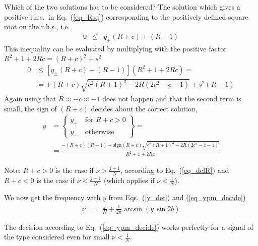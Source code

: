 \documentclass[english, parskip=full]{scrartcl}
\newcommand{\tecxt}{}
\begin{document}
Which of the two solutions has to be considered?
The solution which gives a positive l.h.s.\ in
Eq.~(\ref{eq_Rsq}) corresponding to the positively defined square root on the r.h.s., i.e.
\begin{eqnarray}
  \label{y_plus_minus}
  0 &\leq& y_\pm (R+c) + (R-1)
\end{eqnarray}
This inequality can be evaluated by multiplying with the positive factor
$R^2 + 1 + 2Rc = (R+c)^2 + s^2$
\begin{align}
  0 &\leq [y_\pm (R+c) + (R-1)] (R^2 + 1 + 2Rc)
  =\\
  &= \pm (R+c) \sqrt{c^2(R+1)^2 - 2R(2c^2-c-1)} + s^2(R-1)
\end{align}
Again using that $R \approx -c \approx -1$ does not happen and that the second term is small,
the sign of $(R+c)$ decides about the correct solution,
\begin{align}
  y &= \left\{
          \begin{array}{l}
             y_+ \quad \text{for } R+c > 0
             \\
             y_- \quad \text{otherwise}
          \end{array}
    \right\}
    =\\
    &=
  \frac{-(R+c)(R-1) + \tecxt\text{sign}(R+c) \sqrt{c^2(R+1)^2 - 2R(2c^2-c-1)}}
       {R^2 + 1 + 2Rc}
  \label{eq_ypm_decide}
\end{align}

Note: $R+c>0$ is the case if $\nu > \frac{j-1}{N}$, according to Eq.~(\ref{eq_defR})
and $R+c<0$ is the case if $\nu < \frac{j-1}{N}$ (which applies if $\nu < \frac 1N$).

We now get the frequency with $y$ from Eqs.~(\ref{y_def}) and
(\ref{eq_ypm_decide})
\begin{eqnarray}
  \nu &=&  \frac{j}{N} + \frac{1}{2\pi}\arcsin\left(y \, \sin 2b \right)
\end{eqnarray}

The decision according to Eq.~(\ref{eq_ypm_decide})
works perfectly for a signal of the type considered even for small $\nu < \frac{1}{N}$.
\end{document}
